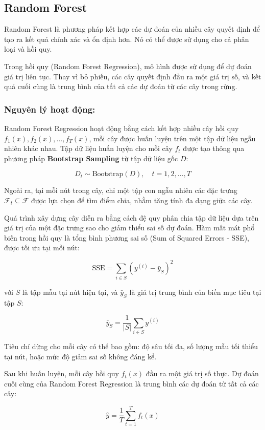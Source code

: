 \subsection{Random Forest}
Random Forest là phương pháp kết hợp các dự đoán của nhiều cây quyết định để tạo ra kết quả chính xác và ổn định hơn. Nó có thể được sử dụng cho cả phân loại và hồi quy.

Trong hồi quy (Random Forest Regression), mô hình được sử dụng để dự đoán giá trị liên tục. Thay vì bỏ phiếu, các cây quyết định đầu ra một giá trị số, và kết quả cuối cùng là trung bình của tất cả các dự đoán từ các cây trong rừng.
\subsubsection*{Nguyên lý hoạt động:}

Random Forest Regression hoạt động bằng cách kết hợp nhiều cây hồi quy \( f_1(x), f_2(x), \ldots, f_T(x) \), mỗi cây được huấn luyện trên một tập dữ liệu ngẫu nhiên khác nhau. Tập dữ liệu huấn luyện cho mỗi cây \( f_t \) được tạo thông qua phương pháp \textbf{Bootstrap Sampling} từ tập dữ liệu gốc \( D \):

\[
D_t \sim \text{Bootstrap}(D), \quad t = 1, 2, \ldots, T
\]

Ngoài ra, tại mỗi nút trong cây, chỉ một tập con ngẫu nhiên các đặc trưng \( \mathcal{F}_t \subseteq \mathcal{F} \) được lựa chọn để tìm điểm chia, nhằm tăng tính đa dạng giữa các cây.

Quá trình xây dựng cây diễn ra bằng cách đệ quy phân chia tập dữ liệu dựa trên giá trị của một đặc trưng sao cho giảm thiểu sai số dự đoán. Hàm mất mát phổ biến trong hồi quy là tổng bình phương sai số (Sum of Squared Errors - SSE), được tối ưu tại mỗi nút:

\[
\text{SSE} = \sum_{i \in S} \left( y^{(i)} - \bar{y}_S \right)^2
\]

với \( S \) là tập mẫu tại nút hiện tại, và \( \bar{y}_S \) là giá trị trung bình của biến mục tiêu tại tập \( S \):

\[
\bar{y}_S = \frac{1}{|S|} \sum_{i \in S} y^{(i)}
\]

Tiêu chí dừng cho mỗi cây có thể bao gồm: độ sâu tối đa, số lượng mẫu tối thiểu tại nút, hoặc mức độ giảm sai số không đáng kể.

Sau khi huấn luyện, mỗi cây hồi quy \( f_t(x) \) đầu ra một giá trị số thực. Dự đoán cuối cùng của Random Forest Regression là trung bình các dự đoán từ tất cả các cây:

\[
\hat{y} = \frac{1}{T} \sum_{t=1}^{T} f_t(x)
\]

